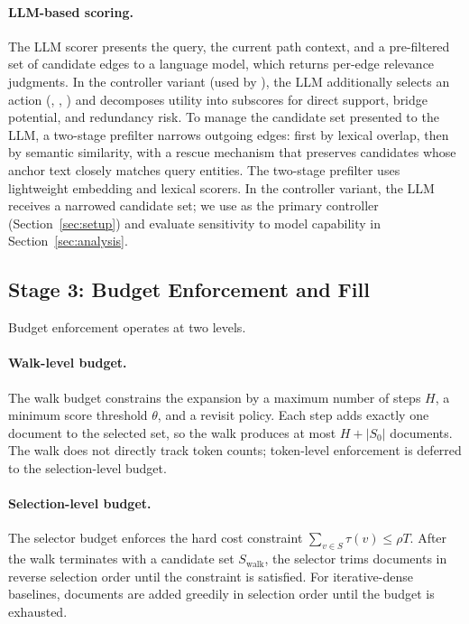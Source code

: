 \paragraph{LLM-based scoring.}
The LLM scorer presents the query, the current path context, and a pre-filtered set of candidate edges to a language model, which returns per-edge relevance judgments. In the controller variant (used by \selcontroller{}), the LLM additionally selects an action (\actstop{}, \actchooseone{}, \actchoosetwo{}) and decomposes utility into subscores for direct support, bridge potential, and redundancy risk. To manage the candidate set presented to the LLM, a two-stage prefilter narrows outgoing edges: first by lexical overlap, then by semantic similarity, with a rescue mechanism that preserves candidates whose anchor text closely matches query entities. The two-stage prefilter uses lightweight embedding and lexical scorers. In the controller variant, the LLM receives a narrowed candidate set; we use \controllerlm{} as the primary controller (Section~\ref{sec:setup}) and evaluate sensitivity to model capability in Section~\ref{sec:analysis}.

\subsection{Stage 3: Budget Enforcement and Fill}
\label{sec:method:budget}

Budget enforcement operates at two levels.

\paragraph{Walk-level budget.}
The walk budget constrains the expansion by a maximum number of steps $H$, a minimum score threshold $\theta$, and a revisit policy. Each step adds exactly one document to the selected set, so the walk produces at most $H + |S_0|$ documents. The walk does not directly track token counts; token-level enforcement is deferred to the selection-level budget.

\paragraph{Selection-level budget.}
The selector budget enforces the hard cost constraint $\sum_{v \in S} \tau(v) \leq \rho T$. After the walk terminates with a candidate set $S_{\text{walk}}$, the selector trims documents in reverse selection order until the constraint is satisfied. For iterative-dense baselines, documents are added greedily in selection order until the budget is exhausted.

